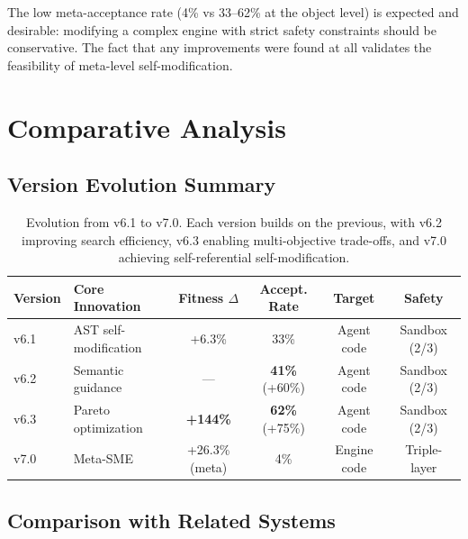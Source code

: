 \documentclass[11pt]{article}
\begin{document}
The low meta-acceptance rate (4\% vs 33--62\% at the object level) is expected and desirable: modifying a complex engine with strict safety constraints should be conservative. The fact that any improvements were found at all validates the feasibility of meta-level self-modification.


\section{Comparative Analysis}

\subsection{Version Evolution Summary}

\begin{table}[h]
\centering
\small
\begin{tabular}{llcccc}
\toprule
\textbf{Version} & \textbf{Core Innovation} & \textbf{Fitness $\Delta$} & \textbf{Accept. Rate} & \textbf{Target} & \textbf{Safety} \\
\midrule
v6.1 & AST self-modification & +6.3\% & 33\% & Agent code & Sandbox (2/3) \\
v6.2 & Semantic guidance & --- & \textbf{41\%} (+60\%) & Agent code & Sandbox (2/3) \\
v6.3 & Pareto optimization & \textbf{+144\%} & \textbf{62\%} (+75\%) & Agent code & Sandbox (2/3) \\
v7.0 & Meta-SME & +26.3\% (meta) & 4\% & Engine code & Triple-layer \\
\bottomrule
\end{tabular}
\caption{Evolution from v6.1 to v7.0. Each version builds on the previous, with v6.2 improving search efficiency, v6.3 enabling multi-objective trade-offs, and v7.0 achieving self-referential self-modification.}
\label{tab:version_evolution}
\end{table}

\subsection{Comparison with Related Systems}
\end{document}
